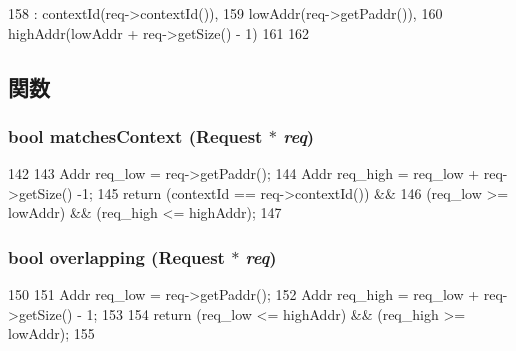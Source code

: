 \begin{DoxyCode}
158             : contextId(req->contextId()),
159               lowAddr(req->getPaddr()),
160               highAddr(lowAddr + req->getSize() - 1)
161         {
162         }
\end{DoxyCode}


\subsection{関数}
\hypertarget{classCacheBlk_1_1Lock_a9f8924af3cc47fae92635799f8742723}{
\subsubsection[{matchesContext}]{\setlength{\rightskip}{0pt plus 5cm}bool matchesContext ({\bf Request} $\ast$ {\em req})}}
\label{classCacheBlk_1_1Lock_a9f8924af3cc47fae92635799f8742723}



\begin{DoxyCode}
142         {
143             Addr req_low = req->getPaddr();
144             Addr req_high = req_low + req->getSize() -1;
145             return (contextId == req->contextId()) &&
146                    (req_low >= lowAddr) && (req_high <= highAddr);
147         }
\end{DoxyCode}
\hypertarget{classCacheBlk_1_1Lock_a2c43977447f93934a8f4699a926becc5}{
\subsubsection[{overlapping}]{\setlength{\rightskip}{0pt plus 5cm}bool overlapping ({\bf Request} $\ast$ {\em req})}}
\label{classCacheBlk_1_1Lock_a2c43977447f93934a8f4699a926becc5}



\begin{DoxyCode}
150         {
151             Addr req_low = req->getPaddr();
152             Addr req_high = req_low + req->getSize() - 1;
153 
154             return (req_low <= highAddr) && (req_high >= lowAddr);
155         }
\end{DoxyCode}



